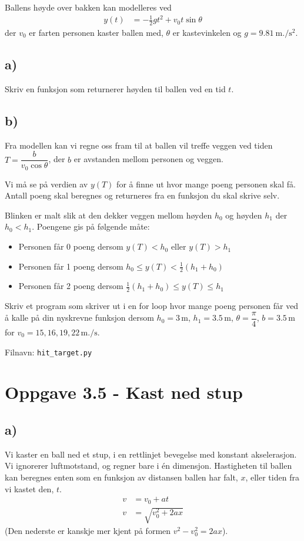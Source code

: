 \documentclass[10pt,a4paper]{article}
\begin{document}
Ballens høyde over bakken kan modelleres ved
	\begin{align*}
		y(t) &= -\frac{1}{2}g t^2 + v_0t\sin\theta
	\end{align*}
	der $v_0$ er farten personen kaster ballen med, $\theta$ er kastevinkelen og $g = \SI{9.81}{\m.\per \square \second}$. 
	
	\subsection*{a)}
	Skriv en funksjon som returnerer høyden til ballen ved en tid $t$.
	\subsection*{b)}
	Fra modellen kan vi regne oss fram til at ballen vil treffe veggen ved tiden 
	$T = \dfrac{b }{v_0\cos\theta}$, der $b$ er avstanden mellom personen og veggen.
	
	Vi må se på verdien av $y(T)$ for å finne ut hvor mange poeng personen skal få. Antall poeng skal beregnes og returneres fra en funksjon du skal skrive selv. 
	
	Blinken er malt slik at den dekker veggen mellom  høyden $h_0$ og høyden $h_1$ der $h_0 < h_1$. Poengene gis på følgende måte:
	\vspace{.2cm}
	\begin{itemize}
		\item Personen får 0 poeng dersom $y(T) < h_0 \text{ eller } y(T) > h_1$
		\item Personen får 1 poeng dersom $h_0 \leq y(T) <\frac{1}{2}(h_1 + h_0)$
		\item Personen får 2 poeng dersom $\frac{1}{2}(h_1 + h_0) \leq y(T) \leq h_1$
	\end{itemize} 
	\vspace{.2cm}
	
	Skriv et program som skriver ut i en for loop hvor mange poeng personen får ved å kalle på din nyskrevne funksjon dersom $h_0 = 3\,\si{\meter}$, $h_1 = 3.5\,\si{\meter}$, $\theta = \dfrac{\pi}{4}$, $b = 3.5\,\si{\meter}$ for $v_0 = 15,16,19,22\,\si{\meter.\per\second}$. 
	
	
	Filnavn: \texttt{hit\_target.py}
\section*{Oppgave 3.5 - Kast ned stup}
\subsection*{a)}
Vi kaster en ball ned et stup, i en rettlinjet bevegelse med konstant akselerasjon. Vi ignorerer luftmotstand, og regner bare i én dimensjon. Hastigheten til ballen kan beregnes enten som en funksjon av distansen ballen har falt, $x$, eller tiden fra vi kastet den, $t$.
\begin{align}
v &= v_0 + at\\
v &= \sqrt{v_0^2 + 2ax}
\end{align}
(Den nederste er kanskje mer kjent på formen $v^2-v_0^2 = 2ax$).
 
\end{document}
